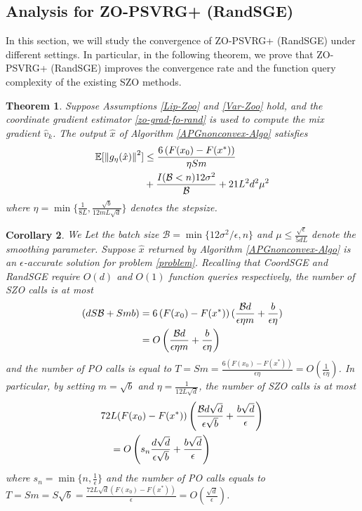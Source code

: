 \documentclass[iicol,sn-basic]{sn-jnl}
\theoremstyle{thmstyleone}%
\newtheorem{theorem}{Theorem}%
\theoremstyle{thmstyletwo}%
\theoremstyle{thmstylethree}%
\newcommand*{\E}{\mathbb{E}}
\newcommand{\norm}[1]{\left\lVert#1\right\rVert}
\newtheorem{corollary}[theorem]{Corollary}
\begin{document}
\subsection{Analysis for ZO-PSVRG+ (RandSGE)}
In this section, we will study the convergence of ZO-PSVRG+ (RandSGE) under different settings. In particular, in the following theorem, we prove that ZO-PSVRG+ (RandSGE) improves the convergence rate and the function query complexity of the existing SZO methods.
\begin{theorem}\label{noncon-zoo-rand}
Suppose Assumptions \ref{Lip-Zoo} and \ref{Var-Zoo} hold, and the coordinate gradient estimator \eqref{zo-grad-fo-rand} is used to compute the mix gradient $\hat{v}_k$. The output $\hat{x}$ of Algorithm \ref{APGnonconvex-Algo} satisfies
  \begin{align}
\E[\norm{g_{\eta}(\hat{x})}^2] & \leq \frac{6\left(F(x_0) - F({x}^*)\right)}{\eta Sm}\notag\\
&  + \frac{I(\mathcal{B} < n)12\sigma ^2}{\mathcal{B}}+21{L^2 d^2 \mu^2}\label{eq-noncon-zoo-rand}
 \end{align}
where $\eta = \min\{\frac{1}{8L}, \frac{\sqrt{b}}{12mL\sqrt{d}}\}$ denotes the stepsize.
\end{theorem}
\begin{corollary}\label{corr11-rand}
We Let the batch size $\mathcal{B} = \min\{12\sigma^2/\epsilon, n\}$ and $\mu \leq \frac{\sqrt{\epsilon}}{5{dL}}$ denote the smoothing parameter. Suppose $\hat{x}$ returned by Algorithm \ref{APGnonconvex-Algo} is an $\epsilon$-accurate solution for problem \eqref{problem}. Recalling that CoordSGE and RandSGE require $O(d)$ and $O(1)$ function queries respectively, the number of SZO calls is at most 
\begin{align}
(dS\mathcal{B}+Smb) & = 6 \left(F(x_0) - F({x}^*)\right) (\frac{\mathcal{B}d}{\epsilon\eta m}+\frac{b}{\epsilon\eta})\notag\\
& = O\left(\frac{\mathcal{B}d}{\epsilon\eta m}+\frac{b}{\epsilon\eta}\right)\label{SZO-call-nocon-rand}
\end{align} 
and the number of PO calls is equal to $T = Sm = \frac{6\left(F(x_0) - F({x}^*)\right)}{\epsilon\eta} = O\left(\frac{1}{\epsilon\eta}\right)$. In particular, by setting $m=\sqrt{b}$ and $\eta = \frac{1}{12L\sqrt{d}}$, the number of SZO calls is at most 
\begin{align}
72 &L (F(x_0)-F(x^*))\left(\frac{\mathcal{B}d\sqrt{d}}{\epsilon\sqrt{b}}+\frac{b\sqrt{d}}{\epsilon}\right)\notag\\
& = O\left(s_n\frac{d\sqrt{d}}{\epsilon \sqrt{b}}+\frac{b\sqrt{d}}{\epsilon}\right)\label{SZO-call-par-nocon-rand}
\end{align}
where $s_n = \min\{n,\frac{1}{\epsilon}\}$ and the number of PO calls equals to $T = Sm = S\sqrt{b} = \frac{72 L \sqrt{d}\left(F(x_0) - F({x}^*)\right)}{\epsilon} = O\left(\frac{\sqrt{d}}{\epsilon}\right)$. 
\end{corollary}
\end{document}
